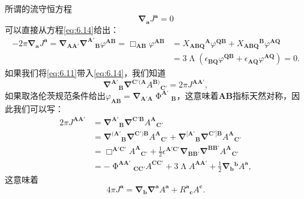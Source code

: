 所谓的流守恒方程
\begin{equation*}
	\boldsymbol{\nabla }_{\boldsymbol{a}} J^{\boldsymbol{a}} =0
\end{equation*}
可以直接从方程\ref{eq:6.14}给出：
\begin{equation*}
	\begin{aligned}
		-2\pi \boldsymbol{\nabla }_{\boldsymbol{a}} J^{\boldsymbol{a}} =\boldsymbol{\nabla }_{\boldsymbol{AA} '}\boldsymbol{\nabla }^{\boldsymbol{A} '}{}_{\boldsymbol{B}} \varphi ^{\boldsymbol{AB}} =\Box _{\boldsymbol{AB}} \varphi ^{\boldsymbol{AB}} & =X{_{\boldsymbol{ABQ}}}^{\boldsymbol{A}} \varphi ^{\boldsymbol{QB}} +X{_{\boldsymbol{ABQ}}}^{\boldsymbol{B}} \varphi ^{\boldsymbol{AQ}}\\
		& =3\upLambda (\epsilon _{\boldsymbol{BQ}} \varphi ^{\boldsymbol{QB}} +\epsilon _{\boldsymbol{AQ}} \varphi ^{\boldsymbol{AQ}} )=0.
	\end{aligned}
\end{equation*}
如果我们将\ref{eq:6.11}带入\ref{eq:6.14}，我们知道
\begin{equation*}
	\boldsymbol{\nabla }^{\boldsymbol{A} '}{}_{\boldsymbol{B}}\boldsymbol{\nabla }^{\boldsymbol{C} '(\boldsymbol{A}} A^{\boldsymbol{B})}{}_{\boldsymbol{C} '} =2\pi J^{\boldsymbol{AA} '} ,
\end{equation*}
如果取洛伦茨规范条件给出$\varphi _{\boldsymbol{AB}} =\boldsymbol{\nabla }_{\boldsymbol{A} '\boldsymbol{A}} \upPhi ^{\boldsymbol{A} '}{}_{\boldsymbol{B}}$，这意味着$\boldsymbol{AB}$指标天然对称，因此我们可以写：
\begin{equation*}
	\begin{aligned}
		2\pi J^{\boldsymbol{AA} '} & =\boldsymbol{\nabla }^{\boldsymbol{A} '}{}_{\boldsymbol{B}}\boldsymbol{\nabla }^{\boldsymbol{C} '\boldsymbol{B}} A^{\boldsymbol{A}}{}_{\boldsymbol{C} '}\\
		& =\boldsymbol{\nabla }^{(\boldsymbol{A} '}{}_{\boldsymbol{B}}\boldsymbol{\nabla }^{\boldsymbol{C} ')\boldsymbol{B}} A^{\boldsymbol{A}}{}_{\boldsymbol{C} '} +\boldsymbol{\nabla }^{[\boldsymbol{A} '}{}_{\boldsymbol{B}}\boldsymbol{\nabla }^{\boldsymbol{C} ']\boldsymbol{B}} A^{\boldsymbol{A}}{}_{\boldsymbol{C} '}\\
		& =\Box ^{\boldsymbol{A} '\boldsymbol{C} '} A^{\boldsymbol{A}}{}_{\boldsymbol{C} '} +\frac{1}{2} \epsilon ^{\boldsymbol{A} '\boldsymbol{C} '}\boldsymbol{\nabla }_{\boldsymbol{BB} '}\boldsymbol{\nabla }^{\boldsymbol{BB} '} A^{\boldsymbol{A}}{}_{\boldsymbol{C} '}\\
		& =-\upPhi ^{\boldsymbol{AA} '}{}_{\boldsymbol{CC} '} A^{\boldsymbol{CC} '} +3\upLambda A^{\boldsymbol{AA} '} +\frac{1}{2}\boldsymbol{\nabla }{_{\boldsymbol{b}}}^{\boldsymbol{b}} A^{\boldsymbol{a}} ,
	\end{aligned}
\end{equation*}
这意味着
\begin{equation*}
	4\pi J^{\boldsymbol{a}} =\boldsymbol{\nabla }_{\boldsymbol{b}}\boldsymbol{\nabla }^{\boldsymbol{a}} A^{\boldsymbol{a}} +R^{\boldsymbol{a}}{}_{\boldsymbol{c}} A^{\boldsymbol{c}} .
\end{equation*}


